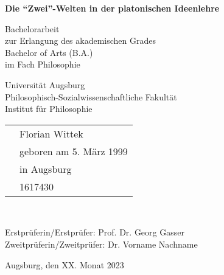 \begin{titlepage}
	\begin{center}
		\vspace*{1cm}
		
		\textbf{\LARGE Die \enquote{Zwei}-Welten in der platonischen Ideenlehre}
		
		\vspace{0.5cm}
		\large
		
		Bachelorarbeit\\
		zur Erlangung des akademischen Grades\\
		Bachelor of Arts (B.A.)\\
		im Fach Philosophie\\
		\vspace {1.5cm}
	\end{center}
	\vspace{2.5cm}
	\raggedright
		Universität Augsburg\\
		Philosophisch-Sozialwissenschaftliche Fakultät\\
		Institut für Philosophie\\
		
		\vspace{1.5cm}
		
		\begin{tabular}{@{}ll}
			\makebox[2.5cm][l]{eingereicht von:} & \hspace{2cm} Florian Wittek\\
			& \hspace{2cm} geboren am 5. März 1999\\
			& \hspace{2cm} in Augsburg\\
			& \hspace{2cm} 1617430\\
		\end{tabular}\\	
		\vspace{1.5cm}

		Erstprüferin/Erstprüfer: \hspace{2cm} Prof. Dr. Georg Gasser\\
		Zweitprüferin/Zweitprüfer: \hspace{1.4cm} Dr. Vorname Nachname

		\vfill
		Augsburg, den \hspace{2.4cm} XX. Monat 2023
		
	
\end{titlepage}